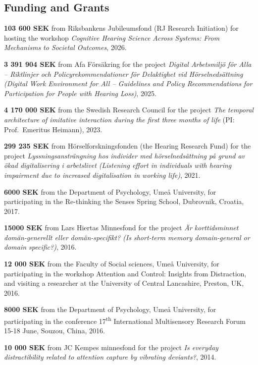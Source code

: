 \documentclass[]{article}
\begin{document}
\subsection{Funding and Grants}\label{funding-and-grants}

\textbf{103 600 SEK} from Riksbankens Jubileumsfond (RJ Research
Initiation) for hosting the workshop \emph{Cognitive Hearing Science
Across Systems: From Mechanisms to Societal Outcomes}, 2026.

\textbf{3 391 904 SEK} from Afa Försäkring for the project \emph{Digital
Arbetsmiljö för Alla -- Riktlinjer och Policyrekommendationer för
Delaktighet vid Hörselnedsättning (Digital Work Environment for All --
Guidelines and Policy Recommendations for Participation for People with
Hearing Loss)}, 2025.

\textbf{4 170 000 SEK} from the Swedish Research Council for the project
\emph{The temporal architecture of imitative interaction during the
first three months of life} (PI: Prof.~Emeritus Heimann), 2023.

\textbf{299 235 SEK} from Hörselforskningsfonden (the Hearing Research
Fund) for the project \emph{Lyssningsansträngning hos individer med
hörselnedsättning på grund av ökad digitalisering i arbetslivet
(Listening effort in individuals with hearing impairment due to
increased digitalisation in working life)}, 2021.

\textbf{6000 SEK} from the Department of Psychology, Umeå University,
for participating in the Re-thinking the Senses Spring School,
Dubrovnik, Croatia, 2017.

\textbf{15000 SEK} from Lars Hiertas Minnesfond for the project \emph{Är
korttidsminnet domän-generellt eller domän-specifikt? (Is short-term
memory domain-general or domain specific?)}, 2016.

\textbf{12 000 SEK} from the Faculty of Social sciences, Umeå
University, for participating in the workshop Attention and Control:
Insights from Distraction, and visiting a researcher at the University
of Central Lancashire, Preston, UK, 2016.

\textbf{8000 SEK} from the Department of Psychology, Umeå University,
for participating in the conference 17\textsuperscript{th} International
Multisensory Research Forum 15-18 June, Souzou, China, 2016.

\textbf{10 000 SEK} from JC Kempes minnesfond for the project \emph{Is
everyday distractibility related to attention capture by vibrating
deviants?}, 2014.
\end{document}
